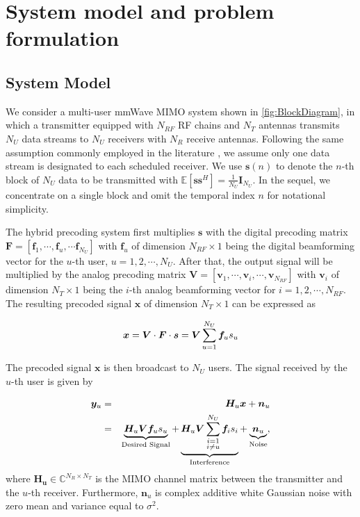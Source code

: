 \documentclass[conference]{IEEEtran}
\begin{document}
\section{System model and problem formulation}

\subsection{System Model}

We consider a multi-user mmWave MIMO system shown in \figurename{ \ref{fig:BlockDiagram}}, in which a transmitter equipped with $N_{RF}$ RF chains and $N_T$ antennas transmits $N_U$ data streams to $N_U$ receivers with $N_R$ receive antennas. Following the same assumption commonly employed in the literature \cite{alkhateeb2015limited}, we assume only one data stream is designated to each scheduled receiver. We use ${\bm s}(n)$ to denote the $n$-th block of $N_U$ data to be transmitted with $\mathbb{E}\left[\bm{ss}^H\right]=\frac{1}{N_U}\bm{I}_{N_U}$. In the sequel, we concentrate on a single block and omit the temporal index $n$ for notational simplicity.


The hybrid precoding system first multiplies ${\bm s}$ with the digital precoding matrix $\bm{F}=\left[{\bm f}_1,\cdots,{\bm f}_u,\cdots{\bm f}_{N_U}\right]$ with ${\bm f}_u$ of dimension $N_{RF}\times 1$ being the digital beamforming vector for the $u$-th user, $u=1,2,\cdots,N_U$. After that, the output signal will be multiplied by the analog precoding matrix $\bm{V}=\left[{\bm v}_1,\cdots,{\bm v}_i,\cdots,{\bm v}_{N_{RF}}\right]$ with ${\bm v}_i$ of dimension $N_T\times 1$ being the $i$-th analog beamforming vector for $i=1,2,\cdots,N_{RF}$. The resulting precoded signal $\bm x$ of dimension $N_T\times 1$  can be expressed as

\begin{equation}{\label{eq:transx1}}
{\bm x} = \bm{V}\cdot \bm{F}\cdot\bm{s}= \bm{V}\sum_{u=1}^{N_U}\bm{f}_us_u
\end{equation}

The precoded signal $\bm x$ is then broadcast to $N_U$ users. The signal received by the $u$-th user is given by

\begin{eqnarray}{\label{eq:transx2}}
{\bm y}_u &=& \bm{H}_u \bm{x} + \bm{n}_u\\
&=&\underbrace{\bm{H}_u \bm{V}\bm{f}_us_u}_\text{Desired Signal}+\underbrace{\bm{H}_u \bm{V}\sum_{\substack{i=1 \\ i\neq u}}^{N_U}\bm{f}_is_i}_\text{Interference}+\underbrace{\bm{n}_u}_\text{Noise},
\end{eqnarray}
where $\bm{H_u}$$\in\mathbb{C}^{N_R\times N_T}$ is the MIMO channel matrix between the transmitter and the $u$-th receiver\cite{el2014spatially}. Furthermore, $\bm{n}_u$ is complex additive white Gaussian noise with zero mean and variance equal to $\sigma^2$.
\end{document}
